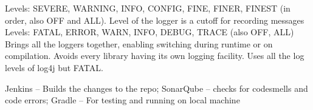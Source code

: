 \documentclass[number]{assignment}
\begin{document}
\begin{landscape}
\begin{multicols}{3}
Levels: SEVERE, WARNING, INFO, CONFIG, FINE, FINER, FINEST (in order, also OFF and ALL). Level of the logger is a cutoff for recording messages
Levels: FATAL, ERROR, WARN, INFO, DEBUG, TRACE (also OFF, ALL)
Brings all the loggers together, enabling switching during runtime or on compilation. Avoids every library having its own logging facility. Uses all the log levels of log4j but FATAL.

Jenkins -- Builds the changes to the repo; SonarQube -- checks for codesmells and code errors; Gradle -- For testing and running on local machine\\

\end{multicols}
\end{landscape}
\end{document}
